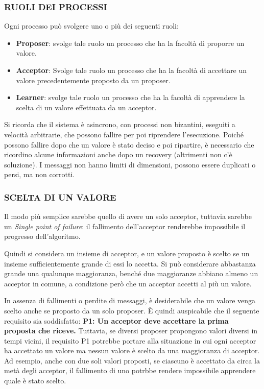 \subsubsection{RUOLI DEI PROCESSI}
Ogni processo può svolgere uno o più dei seguenti ruoli:
\begin{itemize}
    \item \textbf{Proposer}: svolge tale ruolo un processo che ha la facoltà di proporre un valore.
    \item \textbf{Acceptor}: Svolge tale ruolo un processo che ha la facoltà di accettare un valore precedentemente proposto da un proposer.
    \item \textbf{Learner}: svolge tale ruolo un processo che ha la facoltà di apprendere la scelta di un valore effettuata da un acceptor.
\end{itemize}
Si ricorda che il sistema è asincrono, con processi non bizantini, eseguiti a velocità arbitrarie, che possono fallire per poi riprendere l'esecuzione. Poiché possono fallire dopo che un valore è stato deciso e poi ripartire, è necessario che ricordino alcune informazioni anche dopo un recovery (altrimenti non c'è soluzione). I messaggi non hanno limiti di dimensioni, possono essere duplicati o persi, ma non corrotti.

\subsubsection{SCELTA DI UN VALORE}
Il modo più semplice sarebbe quello di avere un solo acceptor, tuttavia sarebbe un \textit{Single point of failure}: il fallimento dell'acceptor renderebbe impossibile il progresso dell'algoritmo.

Quindi si considera un insieme di acceptor, e un valore proposto è scelto se un insieme sufficientemente grande di essi lo accetta. Si può considerare abbastanza grande una qualunque maggioranza, benché due maggioranze abbiano almeno un acceptor in comune, a condizione però che un acceptor accetti al più un valore.

\vspace{5mm}

In assenza di fallimenti o perdite di messaggi, è desiderabile che un valore venga scelto anche se proposto da un solo proposer. È quindi auspicabile che il seguente requisito sia soddisfatto:\newline
\textbf{P1: Un acceptor deve accettare la prima proposta che riceve.}\newline
Tuttavia, se diversi proposer propongono valori diversi in tempi vicini, il requisito P1 potrebbe portare alla situazione in cui ogni acceptor ha accettato un valore ma nessun valore è scelto da una maggioranza di acceptor. Ad esempio, anche con due soli valori proposti, se ciascuno è accettato da circa la metà degli acceptor, il fallimento di uno potrbbe rendere impossibile apprendere quale è stato scelto.


